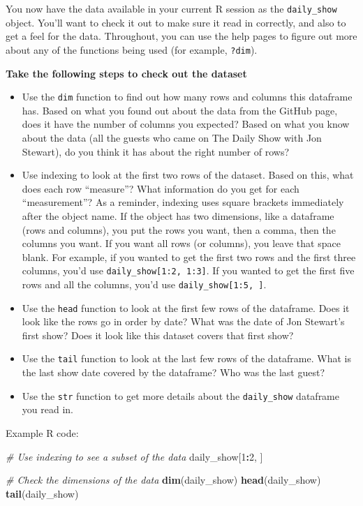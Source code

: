 \documentclass[]{book}
\makeatletter
\newenvironment{Shaded}{\begin{snugshade}}{\end{snugshade}}
\newcommand{\KeywordTok}[1]{\textcolor[rgb]{0.13,0.29,0.53}{\textbf{#1}}}
\newcommand{\DecValTok}[1]{\textcolor[rgb]{0.00,0.00,0.81}{#1}}
\newcommand{\CommentTok}[1]{\textcolor[rgb]{0.56,0.35,0.01}{\textit{#1}}}
\newcommand{\OperatorTok}[1]{\textcolor[rgb]{0.81,0.36,0.00}{\textbf{#1}}}
\newcommand{\NormalTok}[1]{#1}
\providecommand{\tightlist}{%
  \setlength{\itemsep}{0pt}\setlength{\parskip}{0pt}}
\newenvironment{kframe}{%
\medskip{}
\setlength{\fboxsep}{.8em}
 \def\at@end@of@kframe{}%
 \ifinner\ifhmode%
  \def\at@end@of@kframe{\end{minipage}}%
  \begin{minipage}{\columnwidth}%
 \fi\fi%
 \def\FrameCommand##1{\hskip\@totalleftmargin \hskip-\fboxsep
 \colorbox{shadecolor}{##1}\hskip-\fboxsep
     \hskip-\linewidth \hskip-\@totalleftmargin \hskip\columnwidth}%
 \MakeFramed {\advance\hsize-\width
   \@totalleftmargin\z@ \linewidth\hsize
   \@setminipage}}%
 {\par\unskip\endMakeFramed%
 \at@end@of@kframe}
\renewenvironment{Shaded}{\begin{kframe}}{\end{kframe}}
\theoremstyle{definition}
\theoremstyle{definition}
\theoremstyle{definition}
\theoremstyle{remark}
\makeatother
\begin{document}
You now have the data available in your current R session as the
\texttt{daily\_show} object. You'll want to check it out to make sure it
read in correctly, and also to get a feel for the data. Throughout, you
can use the help pages to figure out more about any of the functions
being used (for example, \texttt{?dim}).

\textbf{Take the following steps to check out the dataset}

\begin{itemize}
\tightlist
\item
  Use the \texttt{dim} function to find out how many rows and columns
  this dataframe has. Based on what you found out about the data from
  the GitHub page, does it have the number of columns you expected?
  Based on what you know about the data (all the guests who came on The
  Daily Show with Jon Stewart), do you think it has about the right
  number of rows?
\item
  Use indexing to look at the first two rows of the dataset. Based on
  this, what does each row ``measure''? What information do you get for
  each ``measurement''? As a reminder, indexing uses square brackets
  immediately after the object name. If the object has two dimensions,
  like a dataframe (rows and columns), you put the rows you want, then a
  comma, then the columns you want. If you want all rows (or columns),
  you leave that space blank. For example, if you wanted to get the
  first two rows and the first three columns, you'd use
  \texttt{daily\_show{[}1:2,\ 1:3{]}}. If you wanted to get the first
  five rows and all the columns, you'd use
  \texttt{daily\_show{[}1:5,\ {]}}.
\item
  Use the \texttt{head} function to look at the first few rows of the
  dataframe. Does it look like the rows go in order by date? What was
  the date of Jon Stewart's first show? Does it look like this dataset
  covers that first show?
\item
  Use the \texttt{tail} function to look at the last few rows of the
  dataframe. What is the last show date covered by the dataframe? Who
  was the last guest?
\item
  Use the \texttt{str} function to get more details about the
  \texttt{daily\_show} dataframe you read in.
\end{itemize}

Example R code:

\begin{Shaded}
\begin{Highlighting}[]
\CommentTok{# Use indexing to see a subset of the data}
\NormalTok{daily_show[}\DecValTok{1}\OperatorTok{:}\DecValTok{2}\NormalTok{, ]}

\CommentTok{# Check the dimensions of the data}
\KeywordTok{dim}\NormalTok{(daily_show)}
\KeywordTok{head}\NormalTok{(daily_show)}
\KeywordTok{tail}\NormalTok{(daily_show)}
\end{Highlighting}
\end{Shaded}
\end{document}
